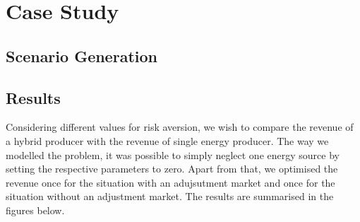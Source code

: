 \section{Case Study}

\subsection{Scenario Generation}




\subsection{Results}
Considering different values for risk aversion, we wish to compare the revenue of a hybrid producer with the revenue of single energy producer. The way we modelled the problem, it was possible to simply neglect one energy source by setting the respective parameters to zero. Apart from that, we optimised the revenue once for the situation with an adujsutment market and once for the situation without an adjustment market. The results are summarised in the figures below. 

